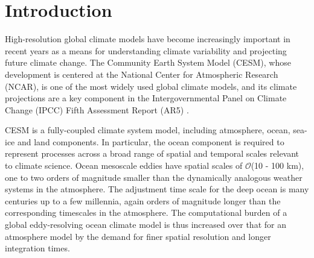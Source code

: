 \section{Introduction} \label{se:int}
High-resolution global climate models have become increasingly important
in recent years as a means for understanding climate variability
and projecting future climate change.  The Community Earth System
Model (CESM), whose development is centered at the National Center for
Atmospheric Research (NCAR), is one of the most widely used global
climate models, and its climate projections are a key component in the
Intergovernmental Panel on Climate Change (IPCC) Fifth Assessment
Report (AR5) \cite{stocker2013ipcc}.


CESM is a fully-coupled climate system model, including atmosphere,
ocean, sea-ice and land components. In particular, the ocean component
is required to represent processes across a broad range of spatial and
temporal scales relevant to climate science. Ocean mesoscale eddies
have spatial scales of $\mathcal{O}$(10 - 100 km), one to two orders of magnitude
smaller than the dynamically analogous weather systems in the
atmosphere. The adjustment time scale for the deep ocean is many
centuries up to a few millennia, again orders of magnitude longer than
the corresponding timescales in the atmosphere. The computational
burden of a global eddy-resolving ocean climate model \cite{bryan2010frontal,mcclean2011prototype,graham2014importance} is
thus increased over that for an atmosphere model by the demand for
finer spatial resolution and longer integration times.

